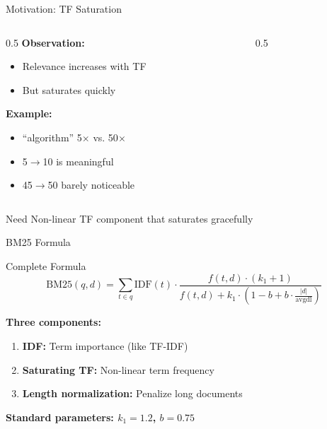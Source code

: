 \documentclass[aspectratio=169]{beamer}
\begin{document}
\begin{frame}{Motivation: TF Saturation}
\begin{columns}
\begin{column}{0.5\textwidth}
\textbf{Observation:}
\begin{itemize}
    \item Relevance increases with TF
    \item But saturates quickly
\end{itemize}

\vspace{1em}

\textbf{Example:}
\begin{itemize}
    \item ``algorithm'' 5$\times$ vs. 50$\times$ 
    \item 5$\rightarrow$10 is meaningful
    \item 45$\rightarrow$50 barely noticeable
\end{itemize}
\end{column}

\begin{column}{0.5\textwidth}

\end{column}
\end{columns}

\vspace{1em}

\begin{alertblock}{Need}
Non-linear TF component that saturates gracefully
\end{alertblock}
\end{frame}

\begin{frame}{BM25 Formula}
\begin{block}{Complete Formula}
$$\text{BM25}(q,d) = \sum_{t \in q} \text{IDF}(t) \cdot \frac{f(t,d) \cdot (k_1+1)}{f(t,d) + k_1 \cdot \left(1-b+b \cdot \frac{|d|}{\text{avgdl}}\right)}$$
\end{block}

\vspace{1em}

\textbf{Three components:}
\begin{enumerate}
    \item \textbf{IDF:} Term importance (like TF-IDF)
    \item \textbf{Saturating TF:} Non-linear term frequency
    \item \textbf{Length normalization:} Penalize long documents
\end{enumerate}

\vspace{1em}

\begin{center}
\textbf{Standard parameters: $k_1 = 1.2$, $b = 0.75$}
\end{center}
\end{frame}
\end{document}
